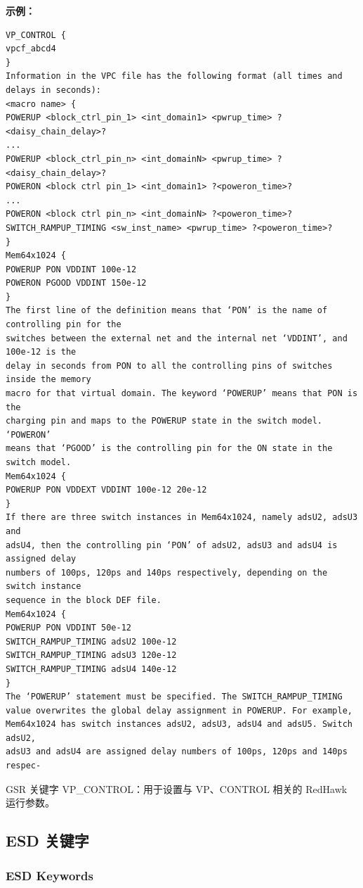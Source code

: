 \textbf{示例：}
\begin{lstlisting}
VP_CONTROL {
vpcf_abcd4
}
Information in the VPC file has the following format (all times and delays in seconds):
<macro name> {
POWERUP <block_ctrl_pin_1> <int_domain1> <pwrup_time> ?<daisy_chain_delay>?
...
POWERUP <block_ctrl_pin_n> <int_domainN> <pwrup_time> ?<daisy_chain_delay>?
POWERON <block ctrl pin_1> <int_domain1> ?<poweron_time>?
...
POWERON <block ctrl pin_n> <int_domainN> ?<poweron_time>?
SWITCH_RAMPUP_TIMING <sw_inst_name> <pwrup_time> ?<poweron_time>?
}
Mem64x1024 {
POWERUP PON VDDINT 100e-12
POWERON PGOOD VDDINT 150e-12
}
The first line of the definition means that ‘PON’ is the name of controlling pin for the
switches between the external net and the internal net ‘VDDINT’, and 100e-12 is the
delay in seconds from PON to all the controlling pins of switches inside the memory
macro for that virtual domain. The keyword ‘POWERUP’ means that PON is the
charging pin and maps to the POWERUP state in the switch model. ‘POWERON’
means that ‘PGOOD’ is the controlling pin for the ON state in the switch model.
Mem64x1024 {
POWERUP PON VDDEXT VDDINT 100e-12 20e-12
}
If there are three switch instances in Mem64x1024, namely adsU2, adsU3 and
adsU4, then the controlling pin ‘PON’ of adsU2, adsU3 and adsU4 is assigned delay
numbers of 100ps, 120ps and 140ps respectively, depending on the switch instance
sequence in the block DEF file.
Mem64x1024 {
POWERUP PON VDDINT 50e-12
SWITCH_RAMPUP_TIMING adsU2 100e-12
SWITCH_RAMPUP_TIMING adsU3 120e-12
SWITCH_RAMPUP_TIMING adsU4 140e-12
}
The ‘POWERUP’ statement must be specified. The SWITCH_RAMPUP_TIMING
value overwrites the global delay assignment in POWERUP. For example,
Mem64x1024 has switch instances adsU2, adsU3, adsU4 and adsU5. Switch adsU2,
adsU3 and adsU4 are assigned delay numbers of 100ps, 120ps and 140ps respec-
\end{lstlisting}

\begin{noteBox}
GSR 关键字 VP\_CONTROL：用于设置与 VP、CONTROL 相关的 RedHawk 运行参数。
\end{noteBox}

\subsection{ESD 关键字}
\subsubsection*{ESD Keywords}


